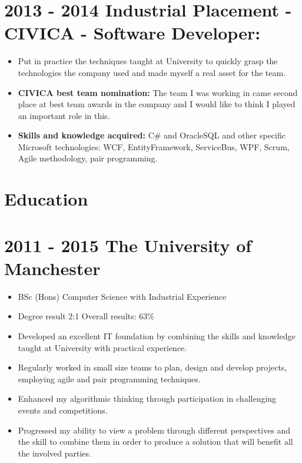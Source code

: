 \documentclass[12pt,a4paper]{res}
\begin{document}
\begin{resume}
\section{\bf 2013 - 2014 \hspace{0.5mm} Industrial Placement - CIVICA - Software Developer:}
\vspace{5mm}    
	\begin{itemize}
	\item[] Put in practice the techniques taught at University to quickly grasp the technologies the company used and made myself a real asset for the team.
	\item{\bf CIVICA best team nomination:} The team I was working in came second place at best team awards in the company and I would like to think I played an important role in this.
	\item{\bf Skills and knowledge acquired:} C\# and OracleSQL and other specific Microsoft technologies: WCF, EntityFramework, ServiceBus, WPF, Scrum, Agile methodology, pair programming.
	\end{itemize}


\section{\large\bf Education}
\vspace{5mm}

\section{\bf 2011 - 2015 \hspace{1.5mm}The University of Manchester}
  
  \begin{itemize} %
     \item[] BSc (Hons) Computer Science  with Industrial Experience
     \item[] Degree result 2:1 \hspace{10mm}Overall results: 63\% 

     \item Developed an excellent IT foundation by combining the skills and knowledge taught
     at University with practical experience.
     \item Regularly worked in small size teams to plan, design and develop projects,   employing agile and pair programming techniques.
     \item Enhanced my algorithmic thinking through participation in challenging events and competitions.
     \item Progressed my ability to view a problem through different perspectives and the skill to combine them in order to produce a solution that will benefit all the involved parties.
   \end{itemize}


\end{resume}
\end{document}
